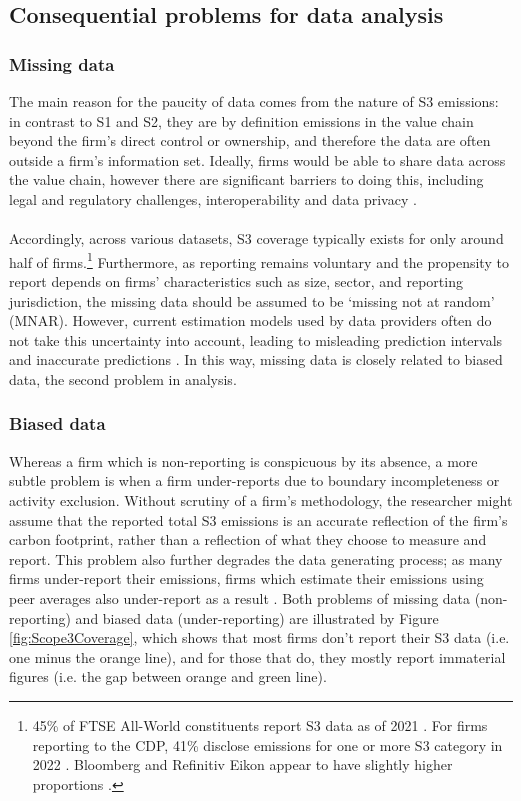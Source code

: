 \documentclass[12pt,twoside]{report}
\begin{document}
\subsection{Consequential problems for data analysis}
\subsubsection{Missing data}
The main reason for the paucity of data comes from the nature of S3 emissions: in contrast to S1 and S2, they are by definition emissions in the value chain beyond the firm's direct control or ownership, and therefore the data are often outside a firm's information set. Ideally, firms would be able to share data across the value chain, however there are significant barriers to doing this, including legal and regulatory challenges, interoperability and data privacy \cite{StenzelWaichman2023}. 
\\\\
Accordingly, across various datasets, S3 coverage typically exists for only around half of firms.\footnote{45\% of FTSE All-World constituents report S3 data as of 2021 \cite{ftserussell2024}. For firms reporting to the CDP, 41\%  disclose emissions for one or more S3 category in 2022 \cite{cdp2023}. Bloomberg and Refinitiv Eikon appear to have slightly higher proportions \cite{Nguyenetal2023}.} Furthermore, as reporting remains voluntary and the propensity to report depends on firms' characteristics such as size, sector, and reporting jurisdiction, the missing data should be assumed to be `missing not at random' (MNAR). However, current estimation models used by data providers often do not take this uncertainty into account, leading to misleading prediction intervals and inaccurate predictions \cite{olesiewicz2021}. In this way, missing data is closely related to biased data, the second problem in analysis. 

\subsubsection{Biased data}
Whereas a firm which is non-reporting is conspicuous by its absence, a more subtle problem is when a firm under-reports due to boundary incompleteness or activity exclusion. Without scrutiny of a firm's methodology, the researcher might assume that the reported total S3 emissions is an accurate reflection of the firm's carbon footprint, rather than a reflection of what they choose to measure and report. This problem also further degrades the data generating process; as many firms under-report their emissions, firms which estimate their emissions using peer averages also under-report as a result \cite{Hoepner2021}. Both problems of missing data (non-reporting) and biased data (under-reporting) are illustrated by Figure \ref{fig:Scope3Coverage}, which shows that most firms don't report their S3 data (i.e. one minus the orange line), and for those that do, they mostly report immaterial figures (i.e. the gap between orange and green line). 
\end{document}
